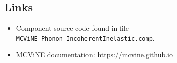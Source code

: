\subsection*{Links}
\begin{itemize}
  \item Component source code found in file \texttt{MCViNE\_Phonon\_IncoherentInelastic.comp}.
  \item MCViNE documentation: https://mcvine.github.io
\end{itemize}
